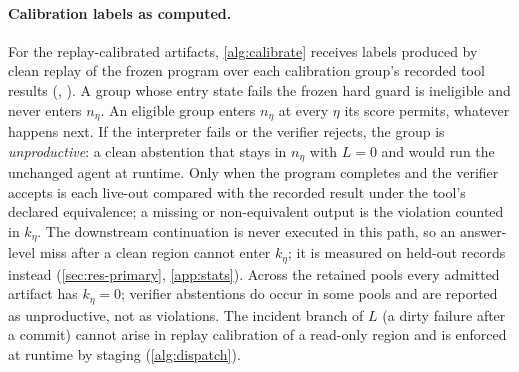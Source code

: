 \paragraph{Calibration labels as computed.}
For the replay-calibrated artifacts, \cref{alg:calibrate} receives labels produced
by clean replay of the frozen program over each calibration group's recorded
tool results (, ). A group
whose entry state fails the frozen hard guard is ineligible and never enters
$n_\eta$. An eligible group enters $n_\eta$ at every $\eta$ its score permits,
whatever happens next. If the interpreter fails or the verifier rejects, the
group is \emph{unproductive}: a clean abstention that stays in $n_\eta$ with
$L=0$ and would run the unchanged agent at runtime. Only when the program
completes and the verifier accepts is each live-out compared with the recorded
result under the tool's declared equivalence; a missing or non-equivalent
output is the violation counted in $k_\eta$. The downstream continuation is
never executed in this path, so an answer-level miss after a clean region
cannot enter $k_\eta$; it is measured on held-out records instead
(\cref{sec:res-primary}, \cref{app:stats}). Across the retained pools every
admitted artifact has $k_\eta=0$; verifier abstentions do occur in some pools
and are reported as unproductive, not as violations. The incident branch of
$L$ (a dirty failure after a commit) cannot arise in replay calibration of a
read-only region and is enforced at runtime by staging (\cref{alg:dispatch}).

\begin{table}[t]
  \centering
  \caption{Certificate level of every primary artifact. $m$ is the number of
  candidates that reached calibration, fixed conditional on train and
  development data; $U$ is the zero-violation upper bound at $n=92$ under the
  per-candidate budget $\gamma=\delta/|\Lambda|$ and under the candidate-wide
  budget $\gamma=\delta/(m|\Lambda|)$. Rows are recomputed from the retained
  per-threshold tables () of the admitted
  artifacts. A provider-free recompilation from the sealed discovery
  checkpoints reproduces both admitted artifacts (identical ids, split digests,
  and bounds) and recovers the dominated two-read candidates' tables, which are
  also 92/0 at every $\eta\ge0.14$ with $U=0.0498$
  ().}
  \label{tab:multiplicity-accounting}
  \footnotesize
  \setlength{\tabcolsep}{4pt}
  
\end{table}

